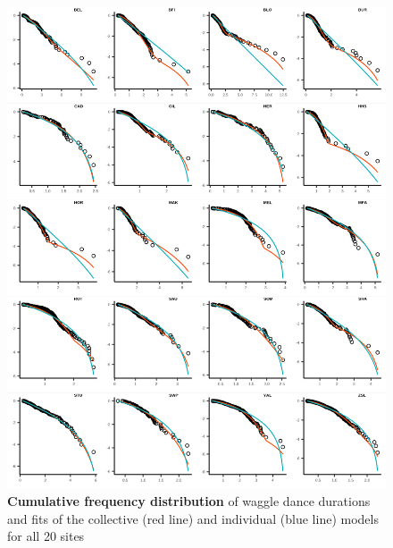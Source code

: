 \documentclass[12pt,letter]{amsart}
\begin{document}
\begin{figure}[h]
	\centering
	\includegraphics{../Results/figures/SI_figures/allsites_plot.png}
	\caption{\textbf{Cumulative frequency distribution} of waggle dance durations and fits of the collective (red line) and individual (blue line) models for all 20 sites}
\end{figure}

\newpage

\clearpage
\end{document}
